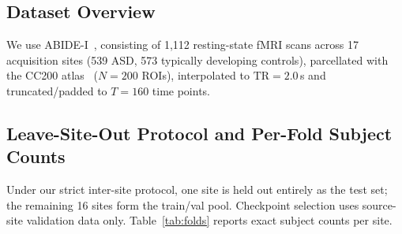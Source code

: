 \documentclass[runningheads]{llncs}
\begin{document}
\subsection{Dataset Overview}
We use ABIDE-I~\cite{dimartino2014abide}, consisting of 1,112 resting-state fMRI scans across 17 acquisition sites (539 ASD, 573 typically developing controls), parcellated with the CC200 atlas~\cite{craddock2012cc200} ($N{=}200$ ROIs), interpolated to $\mathrm{TR}{=}2.0$\,s and truncated/padded to $T{=}160$ time points.
\subsection{Leave-Site-Out Protocol and Per-Fold Subject Counts}
Under our strict inter-site protocol, one site is held out entirely as the test set; the remaining 16 sites form the train/val pool. Checkpoint selection uses source-site validation data only. Table~\ref{tab:folds} reports exact subject counts per site.
\end{document}

